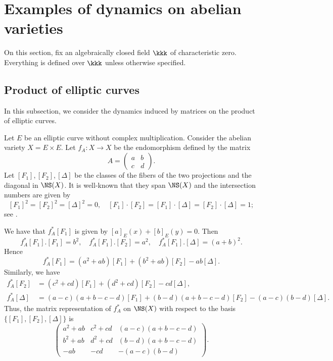 \section{Examples of dynamics on abelian varieties}

On this section, fix an algebraically closed field \(\kkk\) of characteristic zero.
Everything is defined over \(\kkk\) unless otherwise specified. 

\subsection{Product of elliptic curves}

    In this subsection, we consider the dynamics induced by matrices on the product of elliptic curves.

    Let \(E\) be an elliptic curve without complex multiplication. 
    Consider the abelian variety \(X = E \times E\). 
    Let \(f_A: X \to X\) be the endomorphism defined by the matrix
    \[ A = \begin{pmatrix}
        a & b \\
        c & d
    \end{pmatrix}. \]
    Let \([F_1], [F_2], [\Delta]\) be the classes of the fibers of the two projections and the diagonal in \(\NS(X)\).
    It is well-known that they span \(\NS(X)\) and the intersection numbers are given by
    \[ [F_1]^2 = [F_2]^2 = [\Delta]^2 = 0, \quad [F_1] \cdot [F_2] = [F_1] \cdot [\Delta] = [F_2] \cdot [\Delta] = 1; \]
    see \cite[Section 1.5.B]{Laz04a}.

    We have that \(f_A^*[F_1]\) is given by \([a]_E (x) + [b]_E (y) = 0\).
    Then 
    \[ f_A^*[F_1].[F_1] = b^2, \quad f_A^*[F_1].[F_2] = a^2, \quad f_A^*[F_1].[\Delta] = (a+b)^2. \]
    Hence 
    \[ f_A^*[F_1] = (a^2+ab) [F_1] + (b^2+ab) [F_2] - ab [\Delta]. \]
    Similarly, we have
    \begin{align*}
        f_A^*[F_2] &= (c^2+cd) [F_1] + (d^2+cd) [F_2] - cd [\Delta], \\
        f_A^*[\Delta] &= (a-c)(a+b-c-d) [F_1] + (b-d)(a+b-c-d) [F_2] - (a-c)(b-d) [\Delta].
    \end{align*}
    Thus, the matrix representation of \(f_A^*\) on \(\NS(X)\) with respect to the basis \(\{[F_1], [F_2], [\Delta]\}\) is
    \[
        \begin{pmatrix}
            a^2+ab & c^2+cd & (a-c)(a+b-c-d) \\
            b^2+ab & d^2+cd & (b-d)(a+b-c-d) \\
            -ab & -cd & -(a-c)(b-d)
        \end{pmatrix}.
    \]

